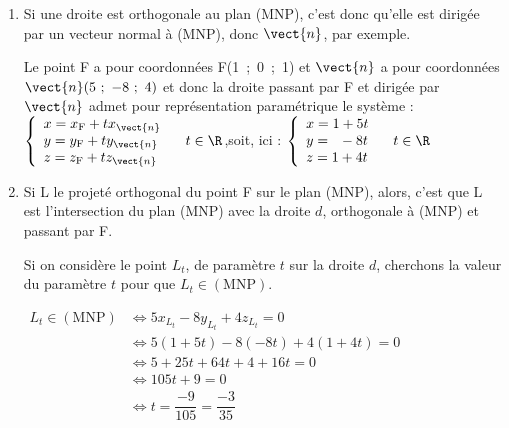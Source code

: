 \begin{enumerate}
\begin{enumerate}
Comme $\mathrm{M} \in (\mathrm{MNP})$, $d$ est tel que :

$\begin{aligned} 5x_\mathrm{M} - 8y_\mathrm{M} + 4z_\mathrm{M} + d= 0
&\iff 5\times 1 - 8\times 1 + 4\times \dfrac{3}{4} + d =0\\
&\iff 5 - 8 + 3 + d=0\\
&\iff d = 0\\ \end{aligned}$

Une équation cartésienne de (MNP) est donc bien $5x-8y+4z=0$.
	\end{enumerate}
\item Si une droite est orthogonale au plan (MNP), c'est donc qu'elle est dirigée par un vecteur normal à (MNP), donc $\vect{n}$, par exemple.

Le point F a pour coordonnées F(1~;~0~;~1) et $\vect{n}$ a pour coordonnées $\vect{n}(5~;~-8~;~4)$ et donc la droite passant par F et dirigée par $\vect{n}$ admet pour représentation paramétrique le système : $\left\{\begin{array}{l} x=x_{\mathrm{F}} + tx_{\vect{n}}\\
	y=y_{\mathrm{F}} + ty_{\vect{n}}\\
	z=z_{\mathrm{F}} + tz_{\vect{n}} \end{array}\right.\quad t \in \R $,\qquad  soit, ici : $\left\{\begin{array}{l} x=1 + 5t\\
	y=\phantom{1}-8t\\
	z=1+4t \end{array}\right.\quad t \in \R $

\item Si L le projeté orthogonal du point F sur le plan (MNP), alors, c'est que L est l'intersection du plan (MNP) avec la droite $d$, orthogonale à (MNP) et passant par F.

Si on considère le point $L_t$, de paramètre $t$ sur la droite $d$, cherchons la valeur du paramètre $t$ pour que $L_t \in (\mathrm{MNP})$.

$ \begin{aligned} L_t \in (\mathrm{MNP}) &\iff 5x_{L_t} - 8y_{L_t} + 4z_{L_t} = 0\\
		&\iff 5(1 + 5t) - 8(-8t) + 4(1 + 4t) = 0\\
		&\iff 5 + 25t +64t + 4 + 16 t = 0\\
		&\iff 105t + 9 = 0\\
		&\iff t = \dfrac{-9}{105} = \dfrac{-3}{35}	\\ \end{aligned}$


\end{enumerate}
